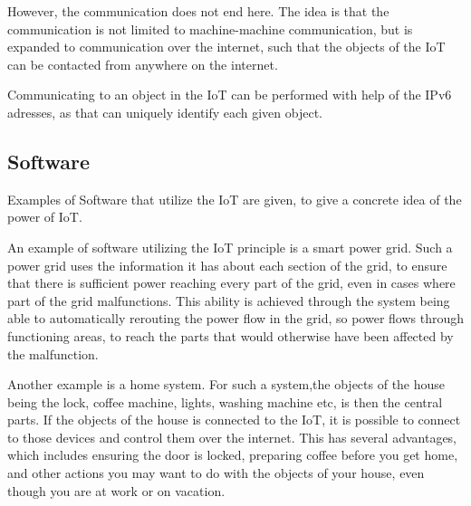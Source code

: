 However, the communication does not end here.
The idea is that the communication is not limited to machine-machine communication, but is expanded to communication over the internet, such that the objects of the IoT can be contacted from anywhere on the internet.

Communicating to an object in the IoT can be performed with help of the IPv6 adresses, as that can uniquely identify each given object.

\subsection{Software}
Examples of Software that utilize the IoT are given, to give a concrete idea of the power of IoT.

An example of software utilizing the IoT principle is a smart power grid. 
Such a power grid uses the information it has about each section of the grid, to ensure that there is sufficient power reaching every part of the grid, even in cases where part of the grid malfunctions.
This ability is achieved through the system being able to automatically rerouting the power flow in the grid, so power flows through functioning areas, to reach the parts that would otherwise have been affected by the malfunction.

Another example is a home system.
For such a system,the objects of the house being the lock, coffee machine, lights, washing machine etc, is then the central parts.
If the objects of the house is connected to the IoT, it is possible to connect to those devices and control them over the internet.
This has several advantages, which includes ensuring the door is locked, preparing coffee before you get home, and other actions you may want to do with the objects of your house, even though you are at work or on vacation.